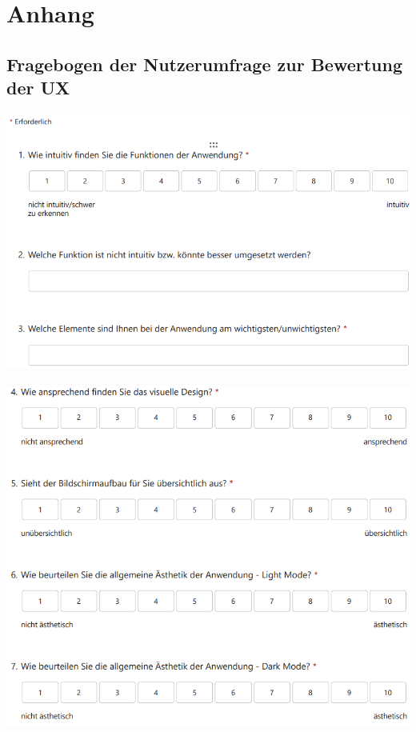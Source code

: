 \chapter*{Anhang}

\section*{Fragebogen der Nutzerumfrage zur Bewertung der UX}
\label{app:fragebogenNutzerumfrage}

\noindent
\includegraphics[width=\textwidth]{appendix/Frage1-3.png}
\par\vspace{\baselineskip} 

\noindent
\includegraphics[width=\textwidth]{appendix/Frage4-7.png}
\par\vspace{\baselineskip} 

